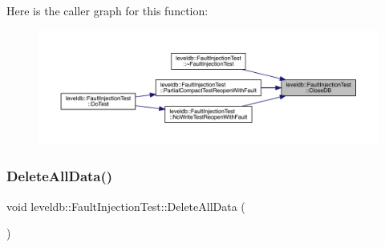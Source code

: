 Here is the caller graph for this function\+:
\nopagebreak
\begin{figure}[H]
\begin{center}
\leavevmode
\includegraphics[width=350pt]{classleveldb_1_1_fault_injection_test_ab0290ce2456f04e5309165196369e834_icgraph}
\end{center}
\end{figure}
\mbox{\label{classleveldb_1_1_fault_injection_test_a6e112ba6b03957228317818c0e91fa04}} 
\subsubsection{\texorpdfstring{DeleteAllData()}{DeleteAllData()}}
{\footnotesize\ttfamily void leveldb\+::\+Fault\+Injection\+Test\+::\+Delete\+All\+Data (\begin{DoxyParamCaption}{ }\end{DoxyParamCaption})\hspace{0.3cm}{\ttfamily [inline]}}

